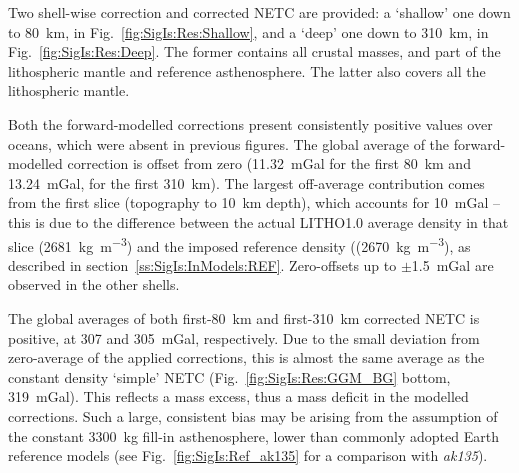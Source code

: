 Two shell-wise correction and corrected NETC are provided: a `shallow' one down to \SI{80}{\kilo \metre}, in Fig.~\ref{fig:SigIs:Res:Shallow}, and a `deep' one down to \SI{310}{\kilo \metre}, in Fig.~\ref{fig:SigIs:Res:Deep}.
The former contains all crustal masses, and part of the lithospheric mantle and reference asthenosphere. The latter also covers all the lithospheric mantle.

Both the forward-modelled corrections present consistently positive values over oceans, which were absent in previous figures.
The global average of the forward-modelled correction is offset from zero (\SI[retain-explicit-plus]{+11.32}{mGal} for the first \SI{80}{\kilo \metre} and \SI[retain-explicit-plus]{+13.24}{mGal}, for the first \SI{310}{\kilo \metre}).
The largest off-average contribution comes from the first slice (topography to \SI{10}{\kilo \metre} depth), which accounts for \SI[retain-explicit-plus]{+10}{mGal} -- this is due to the difference between the actual {LITHO1.0} average density in that slice (\SI{2681}{\kilo \gram \per \cubic \metre}) and the imposed reference density ((\SI{2670}{\kilo \gram \per \cubic \metre}), as described in section~\ref{ss:SigIs:InModels:REF}.
Zero-offsets up to $\pm$\SI{1.5}{mGal} are observed in the other shells.



The global averages of both first-\SI{80}{\kilo \metre} and first-\SI{310}{\kilo \metre} corrected NETC is positive, at \num{307} and \SI{305}{mGal}, respectively.
Due to the small deviation from zero-average of the applied corrections, this is almost the same average as the constant density `simple' NETC (Fig.~\ref{fig:SigIs:Res:GGM_BG} bottom, \SI{319}{mGal}).
This reflects a mass excess, thus a mass deficit in the modelled corrections.
Such a large, consistent bias may be arising from the assumption of the constant \SI{3300}{\kilo \gram} fill-in asthenosphere, lower than commonly adopted Earth reference models (see Fig.~\ref{fig:SigIs:Ref_ak135} for a comparison with \textit{ak135}).

